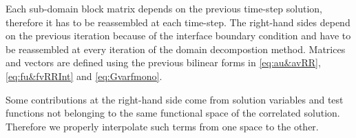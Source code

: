 Each sub-domain block matrix depends on the previous time-step solution, therefore it has to be reassembled at each time-step. The right-hand sides depend on the previous iteration because of the interface boundary condition and have to be reassembled at every iteration of the domain decompostion method. Matrices and vectors are defined using the previous bilinear forms in \eqref{eq:au&avRR}, \eqref{eq:fu&fvRRInt} and \eqref{eq:Gvarfmono}.
%

Some contributions at the right-hand side come from solution variables and test functions not belonging to the same functional space of the correlated solution. Therefore we properly interpolate such terms from one space to the other.

